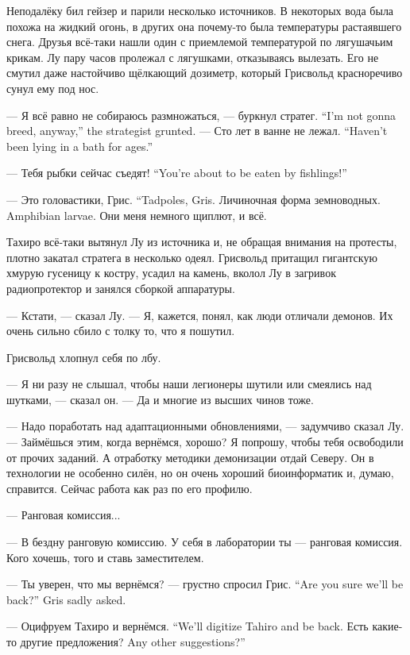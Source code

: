 Неподалёку бил гейзер и парили несколько источников.
В некоторых вода была похожа на жидкий огонь, в других она почему-то была температуры растаявшего снега.
Друзья всё-таки нашли один с приемлемой температурой по лягушачьим крикам.
Лу пару часов пролежал с лягушками, отказываясь вылезать.
Его не смутил даже настойчиво щёлкающий дозиметр, который Грисвольд красноречиво сунул ему под нос.

{--- Я всё равно не собираюсь размножаться, --- буркнул стратег.}
{``I'm not gonna breed, anyway,'' the strategist grunted.}
{--- Сто лет в ванне не лежал.}
{``Haven't been lying in a bath for ages.''}

{--- Тебя рыбки сейчас съедят!}
{``You're about to be eaten by fishlings!''}

{--- Это головастики, Грис.}
{``Tadpoles, Gris.}
{Личиночная форма земноводных.}
{Amphibian larvae.}
Они меня немного щиплют, и всё.

Тахиро всё-таки вытянул Лу из источника и, не обращая внимания на протесты, плотно закатал стратега в несколько одеял.
Грисвольд притащил гигантскую хмурую гусеницу к костру, усадил на камень, вколол Лу в загривок радиопротектор и занялся сборкой аппаратуры.

--- Кстати, --- сказал Лу.
--- Я, кажется, понял, как люди отличали демонов.
Их очень сильно сбило с толку то, что я пошутил.

Грисвольд хлопнул себя по лбу.

--- Я ни разу не слышал, чтобы наши легионеры шутили или смеялись над шутками, --- сказал он.
--- Да и многие из высших чинов тоже.

--- Надо поработать над адаптационными обновлениями, --- задумчиво сказал Лу.
--- Займёшься этим, когда вернёмся, хорошо?
Я попрошу, чтобы тебя освободили от прочих заданий.
А отработку методики демонизации отдай Северу.
Он в технологии не особенно силён, но он очень хороший биоинформатик и, думаю, справится.
Сейчас работа как раз по его профилю.

--- Ранговая комиссия...

--- В бездну ранговую комиссию.
У себя в лаборатории ты --- ранговая комиссия.
Кого хочешь, того и ставь заместителем.

{--- Ты уверен, что мы вернёмся? --- грустно спросил Грис.}
{``Are you sure we'll be back?'' Gris sadly asked.}

{--- Оцифруем Тахиро и вернёмся.}
{``We'll digitize Tahiro and be back.}
{Есть какие-то другие предложения?}
{Any other suggestions?''}


